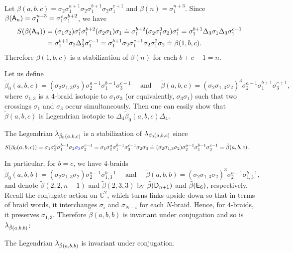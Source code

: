 \begin{example}\label{example:stabilization of An}
Let $\beta(a,b,c)=\sigma_2\sigma_1^{a+1}\sigma_2\sigma_1^{b+1}\sigma_2\sigma_1^{c+1}$ and $\beta(n)=\sigma_1^{n+3}$.
Since $\beta(\mathsf{A}_n)=\sigma_1^{n+3} = \sigma_1^{c}\sigma_1^{b+2}$, we have
\begin{align*}
S(\beta(\mathsf{A}_n))&=(\sigma_1\sigma_2)\sigma_1^{c}\sigma_1^{b+2}(\sigma_2\sigma_1)\sigma_1\mathrel{\dot{=}}\sigma_1^{b+2} (\sigma_2\sigma_1^3\sigma_2) \sigma_1^{c}
=\sigma_1^{b+1}\Delta_3 \sigma_1 \Delta_3 \sigma_1^{c-1}\\
&=\sigma_1^{b+1} \sigma_2\Delta_3^2\sigma_1^{c-1}
=\sigma_1^{b+1}\sigma_2\sigma_1^{c+1}\sigma_2\sigma_1^2\sigma_2
\mathrel{\dot{=}}\beta(1,b,c).
\end{align*}
Therefore $\beta(1,b,c)$ is a stabilization of $\beta(n)$ for each $b+c-1=n$.
\end{example}

Let us define 
\[
\tilde\beta_0(a,b,c)=
(\sigma_2\sigma_{1,3}\sigma_2) \sigma_2^{a-1}\sigma_1^{b-1}\sigma_3^{c-1}\quad\text{ and }\quad
\tilde\beta(a,b,c)=
(\sigma_2\sigma_{1,3}\sigma_2)^3 \sigma_2^{a-1} \sigma_1^{b+1}\sigma_3^{c+1},
\]
where $\sigma_{1,3}$ is a $4$-braid isotopic to $\sigma_1\sigma_3$ (or equivalently, $\sigma_3\sigma_1$) such that two crossings $\sigma_1$ and $\sigma_3$ occur simultaneously.
Then one can easily show that $\tilde\beta(a,b,c)$ is Legendrian isotopic to $\Delta_4\tilde\beta_0(a,b,c)\Delta_4$.

\begin{example}
The Legendrian $\lambda_{\tilde\beta_0(a,b,c)}$ is a stabilization of $\lambda_{\beta_0(a,b,c)}$ since 
\begin{align*}
S(\beta_0(a,b,c)) &= \sigma_1\sigma_2^a \sigma_1^{b-1} \sigma_2 {\color{blue}\sigma_3}\sigma_2^{c-1}
=\sigma_1\sigma_2^a \sigma_1^{b-1}\sigma_3^{c-1} \sigma_2\sigma_3
\mathrel{\dot{=}}(\sigma_2 \sigma_{1,3} \sigma_2) \sigma_2^{a-1} \sigma_1^{b-1}\sigma_3^{c-1}
=\tilde\beta(a,b,c).
\end{align*}
\end{example}

In particular, for $b=c$, we have $4$-braids
\[
\tilde\beta_0(a,b,b)=
(\sigma_2\sigma_{1,3}\sigma_2) \sigma_2^{a-1}\sigma_{1,3}^{b-1}\quad\text{ and }\quad
\tilde\beta(a,b,b)=
(\sigma_2\sigma_{1,3}\sigma_2)^3 \sigma_2^{a-1}\sigma_{1,3}^{b-1},
\]
and denote $\tilde\beta(2,2,n-1)$ and $\tilde\beta(2,3,3)$ by $\tilde\beta(\mathsf{D}_{n+1})$ and $\tilde\beta(\mathsf{E}_6)$, respectively.
Recall the conjugate action on $\mathbb{C}^2$, which turns links upside down so that in terms of braid words, it interchanges $\sigma_i$ and $\sigma_{N-i}$ for each $N$-braid.
Hence, for $4$-braids, it preserves $\sigma_{1,3}$. Therefore $\tilde\beta(a,b,b)$ is invariant under conjugation and so is $\lambda_{\tilde\beta(a,b,b)}$:
\begin{lemma}
The Legendrian $\lambda_{\tilde\beta(a,b,b)}$ is invariant under conjugation.
\end{lemma}

